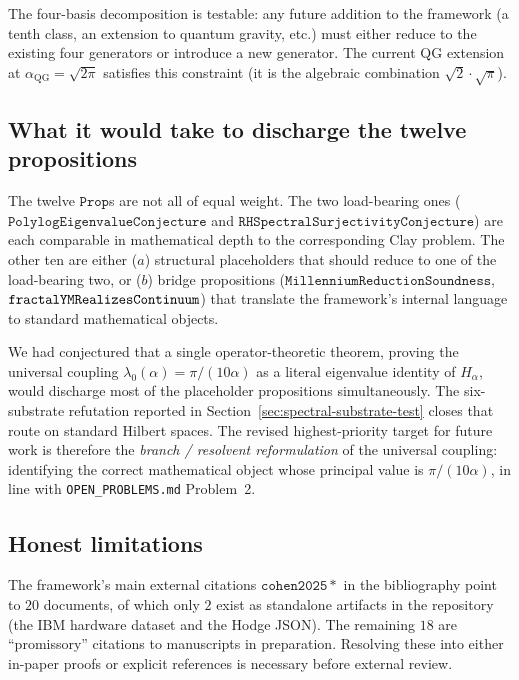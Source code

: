 \documentclass[11pt,a4paper]{article}
\theoremstyle{definition}
\theoremstyle{remark}
\begin{document}
The four-basis decomposition is testable: any future addition to the
framework (a tenth class, an extension to quantum gravity, etc.) must
either reduce to the existing four generators or introduce a new
generator. The current QG extension at $\alpha_{\mathrm{QG}} = \sqrt{2\pi}$
satisfies this constraint (it is the algebraic combination
$\sqrt{2}\cdot\sqrt{\pi}$).

\subsection{What it would take to discharge the twelve propositions}

The twelve $\mathtt{Prop}$s are not all of equal weight. The two
load-bearing ones ($\mathtt{PolylogEigenvalueConjecture}$ and
$\mathtt{RHSpectralSurjectivityConjecture}$) are each comparable in
mathematical depth to the corresponding Clay problem. The other ten are
either ($a$) structural placeholders that should reduce to one of the
load-bearing two, or ($b$) bridge propositions
($\mathtt{MillenniumReductionSoundness}$, $\mathtt{fractalYMRealizes\linebreak Continuum}$)
that translate the framework's internal language to standard
mathematical objects.

We had conjectured that a single operator-theoretic theorem,
proving the universal coupling
$\lambda_0(\alpha) = \pi/(10\alpha)$ as a literal eigenvalue identity
of $H_\alpha$, would discharge most of the placeholder propositions
simultaneously. The six-substrate refutation reported in
Section~\ref{sec:spectral-substrate-test} closes that route on standard
Hilbert spaces. The revised highest-priority target for future work is
therefore the \emph{branch / resolvent reformulation} of the universal
coupling: identifying the correct mathematical object whose principal
value is $\pi/(10\alpha)$, in line with
\texttt{OPEN\_PROBLEMS.md} Problem~2.

\subsection{Honest limitations}

The framework's main external citations
$\mathtt{cohen2025*}$ in the bibliography point to $20$ documents, of
which only $2$ exist as standalone artifacts in the repository (the IBM
hardware dataset and the Hodge JSON). The remaining $18$ are
``promissory'' citations to manuscripts in preparation. Resolving these
into either in-paper proofs or explicit references is necessary before
external review.
\end{document}
